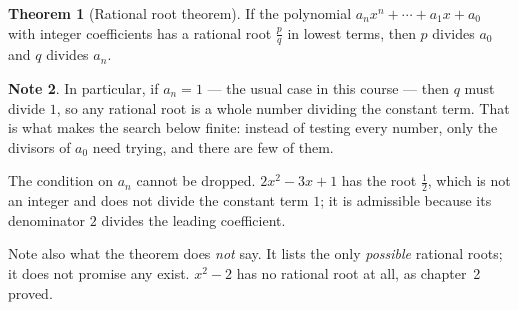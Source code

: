 \documentclass[11pt,a4paper]{article}
\theoremstyle{definition}
\newtheorem{thm}{Theorem}[section]
\newtheorem{note}[thm]{Note}
\begin{document}
\begin{thm}[Rational root theorem]
If the polynomial $a_nx^{n}+\cdots+a_1x+a_0$ with integer coefficients has a
rational root $\frac{p}{q}$ in lowest terms, then $p$ divides $a_0$ and $q$
divides $a_n$.
\end{thm}

\begin{note}
In particular, if $a_n=1$ --- the usual case in this course --- then $q$ must divide
$1$, so any rational root is a whole number dividing the constant term. That is
what makes the search below finite: instead of testing every number, only the
divisors of $a_0$ need trying, and there are few of them.

The condition on $a_n$ cannot be dropped. $2x^{2}-3x+1$ has the root
$\frac{1}{2}$, which is not an integer and does not divide the constant term $1$;
it is admissible because its denominator $2$ divides the leading coefficient.

Note also what the theorem does \emph{not} say. It lists the only \emph{possible}
rational roots; it does not promise any exist. $x^{2}-2$ has no rational root at
all, as chapter~2 proved.
\end{note}
\end{document}
